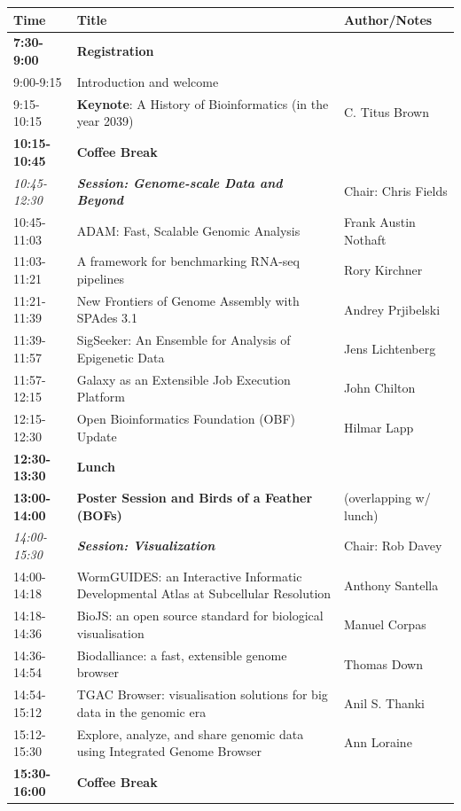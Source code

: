 \documentclass[12pt,oneside]{article}
\begin{document}
\begin{center}
\begin{tabular}{|p{2.35cm}|p{10.15cm}|p{4.1cm}|}
\hline
Time & Title & Author/Notes \\
\hline
\textbf{7:30-9:00} & \textbf{Registration} &\\
\hline
9:00-9:15 & Introduction and welcome &\\
9:15-10:15 & \textbf{Keynote}: A History of Bioinformatics (in the year 2039) & C. Titus Brown\\
\hline
\textbf{10:15-10:45} & \textbf{Coffee Break} &\\
\hline
\textit{10:45-12:30} & \textbf{\textit{Session: Genome-scale Data and Beyond}} & Chair: Chris Fields\\
10:45-11:03 & ADAM: Fast, Scalable Genomic Analysis & Frank Austin Nothaft\\
11:03-11:21 & A framework for benchmarking RNA-seq pipelines & Rory Kirchner\\
11:21-11:39 & New Frontiers of Genome Assembly with SPAdes 3.1 & Andrey Prjibelski\\
11:39-11:57 & SigSeeker: An Ensemble for Analysis of Epigenetic Data & Jens Lichtenberg\\
11:57-12:15 & Galaxy as an Extensible Job Execution Platform & John Chilton\\
12:15-12:30 & Open Bioinformatics Foundation (OBF) Update & Hilmar Lapp\\
\hline
\textbf{12:30-13:30} & \textbf{Lunch} &\\
\textbf{13:00-14:00} & \textbf{Poster Session and Birds of a Feather (BOFs)} &  (overlapping w/ lunch)\\
\hline
\textit{14:00-15:30} & \textbf{\textit{Session: Visualization}} & Chair: Rob Davey\\
14:00-14:18 & WormGUIDES: an Interactive Informatic Developmental Atlas at Subcellular Resolution & Anthony Santella\\
14:18-14:36 & BioJS: an open source standard for biological visualisation & Manuel Corpas\\
14:36-14:54 & Biodalliance: a fast, extensible genome browser & Thomas Down\\
14:54-15:12 & TGAC Browser: visualisation solutions for big data in the genomic era & Anil S. Thanki\\
15:12-15:30 & Explore, analyze, and share genomic data using Integrated Genome Browser & Ann Loraine\\
\hline
\textbf{15:30-16:00} & \textbf{Coffee Break} &\\
\hline
\end{tabular}
\end{center}
\end{document}
